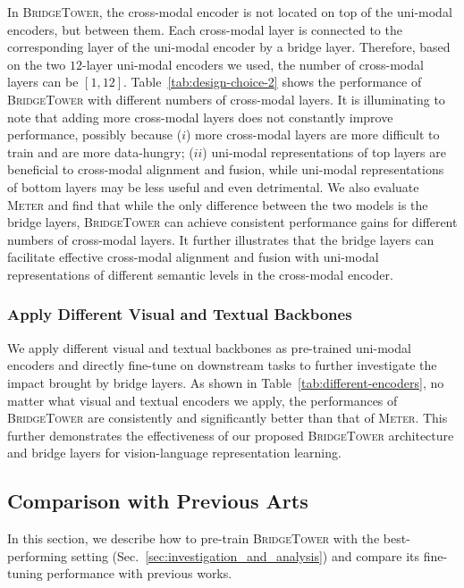 \documentclass[letterpaper]{article} %
\newcommand{\methodname}[0]{\textsc{BridgeTower}}
\newcommand{\metername}[0]{\textsc{Meter}}
\begin{document}
In \methodname{}, the cross-modal encoder is not located on top of the uni-modal encoders, but between them. Each cross-modal layer is connected to the corresponding layer of the uni-modal encoder by a bridge layer. 
Therefore, based on the two $12$-layer uni-modal encoders we used, the number of cross-modal layers can be $[1, 12]$.
Table~\ref{tab:design-choice-2} shows the performance of \methodname{} with different numbers of cross-modal layers.
It is illuminating to note that adding more cross-modal layers does not constantly improve performance, possibly because
($i$) more cross-modal layers are more difficult to train and are more data-hungry;
($ii$) uni-modal representations of top layers are beneficial to cross-modal alignment and fusion, while uni-modal representations of bottom layers may be less useful and even detrimental.
We also evaluate \metername{} and find that while the only difference between the two models is the bridge layers, \methodname{} can achieve consistent performance gains for different numbers of cross-modal layers.
It further illustrates that the bridge layers can facilitate effective cross-modal alignment and fusion with uni-modal representations of different semantic levels in the cross-modal encoder.

\subsubsection{Apply Different Visual and Textual Backbones}
We apply different visual and textual backbones as pre-trained uni-modal encoders and directly fine-tune on downstream tasks to further investigate the impact brought by bridge layers. 
As shown in Table~\ref{tab:different-encoders}, no matter what visual and textual encoders we apply, the performances of \methodname{} are consistently and significantly better than that of \metername{}. 
This further demonstrates the effectiveness of our proposed \methodname{} architecture and bridge layers for vision-language representation learning.

\subsection{Comparison with Previous Arts}
In this section, we describe how to pre-train \methodname{} with the best-performing setting (Sec.~\ref{sec:investigation_and_analysis})
and compare its fine-tuning performance with previous works.
\end{document}
